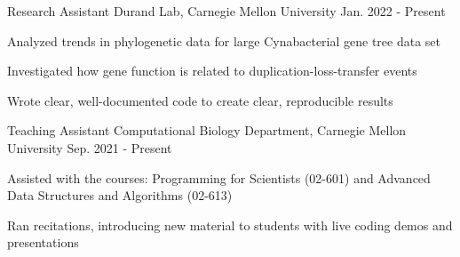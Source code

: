 \begin{cventries}
\vspace{-0.05in}
\cventry
{Research Assistant}
{Durand Lab, Carnegie Mellon University}
{Jan. 2022 - Present}
{}
{
\begin{cvitems}
    \item {Analyzed trends in phylogenetic data for large Cynabacterial gene tree data set}
    \item {Investigated how gene function is related to duplication-loss-transfer events}
    \item {Wrote clear, well-documented code to create clear, reproducible results}
\end{cvitems}
}
\cventry
{Teaching Assistant}
{Computational Biology Department, Carnegie Mellon University}
{Sep. 2021 - Present}
{}
{
\begin{cvitems}
    \item {Assisted with the courses: Programming for Scientists (02-601) and Advanced Data Structures and Algorithms (02-613)}
    \item {Ran recitations, introducing new material to students with live coding demos and presentations}
\end{cvitems}
}

\end{cventries}
